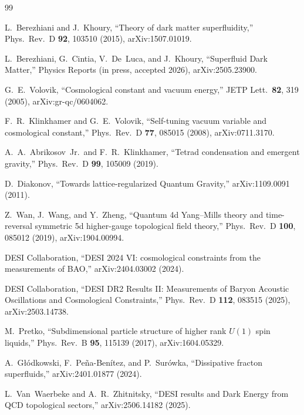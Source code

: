 \documentclass[aps,prd,reprint,nofootinbib,superscriptaddress]{revtex4-2}
\begin{document}
\begin{thebibliography}{99}


L.~Berezhiani and J.~Khoury, ``Theory of dark matter superfluidity,''
Phys.\ Rev.\ D \textbf{92}, 103510 (2015), arXiv:1507.01019.

L.~Berezhiani, G.~Cintia, V.~De~Luca, and J.~Khoury,
``Superfluid Dark Matter,''
Physics Reports (in press, accepted 2026), arXiv:2505.23900.

G.~E.~Volovik, ``Cosmological constant and vacuum energy,''
JETP Lett.\ \textbf{82}, 319 (2005), arXiv:gr-qc/0604062.

F.~R.~Klinkhamer and G.~E.~Volovik, ``Self-tuning vacuum variable and
cosmological constant,''
Phys.\ Rev.\ D \textbf{77}, 085015 (2008), arXiv:0711.3170.

A.~A.~Abrikosov~Jr.\ and F.~R.~Klinkhamer,
``Tetrad condensation and emergent gravity,''
Phys.\ Rev.\ D \textbf{99}, 105009 (2019).

D.~Diakonov,
``Towards lattice-regularized Quantum Gravity,''
arXiv:1109.0091 (2011).

Z.~Wan, J.~Wang, and Y.~Zheng,
``Quantum 4d Yang--Mills theory and time-reversal symmetric 5d higher-gauge topological field theory,''
Phys.\ Rev.\ D \textbf{100}, 085012 (2019), arXiv:1904.00994.

DESI Collaboration, ``DESI 2024 VI: cosmological constraints from the
measurements of BAO,'' arXiv:2404.03002 (2024).

DESI Collaboration, ``DESI DR2 Results II: Measurements of Baryon
Acoustic Oscillations and Cosmological Constraints,''
Phys.\ Rev.\ D \textbf{112}, 083515 (2025), arXiv:2503.14738.


M.~Pretko, ``Subdimensional particle structure of higher rank
$U(1)$ spin liquids,'' Phys.\ Rev.\ B \textbf{95}, 115139 (2017),
arXiv:1604.05329.

A.~G\l{}\'odkowski, F.~Pe\~na-Ben\'itez, and P.~Sur\'owka,
``Dissipative fracton superfluids,'' arXiv:2401.01877 (2024).


L.~Van~Waerbeke and A.~R.~Zhitnitsky,
``DESI results and Dark Energy from QCD topological sectors,''
arXiv:2506.14182 (2025).


\end{thebibliography}
\end{document}
